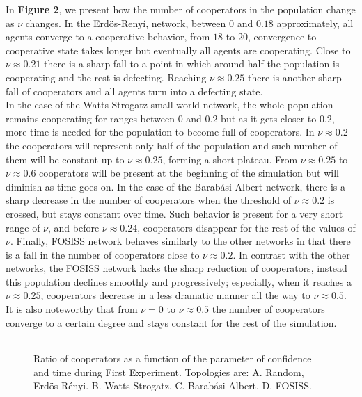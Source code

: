\documentclass{bmcart}
\def\texttt{[image: ]}
\begin{document}
In \textbf{Figure 2}, we present how the number of cooperators in the population
change as $\nu$ changes. In the Erd\"{o}s-Reny\'i, network, between $0$ and
$0.18$ approximately, all agents converge to a cooperative behavior, from $18$
to $20$, convergence to cooperative state takes longer but eventually all agents
are cooperating. Close to $\nu \approx 0.21$ there is a sharp fall to a point in
which around half the population is cooperating and the rest is
defecting. Reaching $\nu \approx 0.25$ there is another sharp fall of
cooperators and all agents turn into a defecting state.\\


In the case of the Watts-Strogatz small-world network, the whole
population remains cooperating for ranges between $0$ and $0.2$ but as
it gets closer to $0.2$, more time is needed for the population to
become full of cooperators. In $\nu \approx 0.2$ the cooperators will
represent only half of the population and such number of them will be
constant up to $\nu \approx 0.25$, forming a short plateau. From
$\nu \approx 0.25$ to $\nu \approx 0.6$ cooperators will be present at
the beginning of the simulation but will diminish as time goes on.  In
the case of the Barab\'asi-Albert network, there is a sharp decrease
in the number of cooperators when the threshold of $\nu \approx 0.2$
is crossed, but stays constant over time. Such behavior is present for
a very short range of $\nu$, and before $\nu \approx 0.24$,
cooperators disappear for the rest of the values of $\nu$. Finally, FOSISS
network behaves similarly to the other networks in that there is a
fall in the number of cooperators close to $\nu \approx 0.2$. In
contrast with the other networks, the FOSISS network lacks the sharp
reduction of cooperators, instead this population declines smoothly
and progressively; especially, when it reaches a $\nu \approx 0.25$,
cooperators decrease in a less dramatic manner all the way to
$\nu \approx 0.5$. It is also noteworthy that from $\nu = 0$ to
$\nu \approx 0.5$ the number of cooperators converge to a certain
degree and stays constant for the rest of the simulation.\\


\begin{figure} [h!]
\centering
\begin{tabular}{cc}
\end{tabular}
\caption{Ratio of cooperators as a function of the parameter of confidence and time during First Experiment. Topologies are: A. Random, Erd\"{o}s-R\'enyi. B. Watts-Strogatz. C. Barab\'asi-Albert. D. FOSISS.
}\label{CD}
\end{figure}
\end{document}
